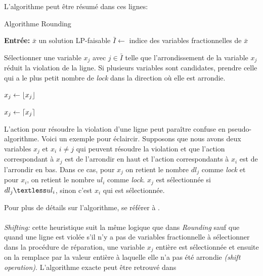 \documentclass[12pt,a4paper,oneside]{book}
\theoremstyle{definition}
\DeclarePairedDelimiter\ceil{\lceil}{\rceil}
\DeclarePairedDelimiter\floor{\lfloor}{\rfloor}
\begin{document}
	L'algorithme peut être résumé dans ces lignes:
		\begin{algorithm}
			\caption{Algorithme Rounding}
			\SetAlgoLined
			\DontPrintSemicolon
			\textbf{Entrée:} $\bar{x}$ un solution LP-faisable \;
			$\bar{I} \gets $ indice des variables fractionnelles de $\bar{x}$ \;
			{
				{
					Sélectionner une variable $x_j$ avec $ j \in \bar{I}$ telle que l'arrondissement de la variable $x_j$ réduit la violation de la ligne. Si plusieurs variables sont candidates, prendre celle qui a le plus petit nombre de \textit{lock} dans la direction où elle est arrondie. \;
				}
				{
					{
						$x_j \gets \floor{x_j} $ \;
					}
					{
						
						$x_j \gets \ceil{x_j} $ \;
					}
				}
			}
		
		\end{algorithm}

	L'action pour résoudre la violation d'une ligne peut paraître confuse en pseudo-algorithme. Voici un exemple pour éclaircir.
	Supposons que nous avons deux variables $x_j$ et $x_i$ $ i \neq j$ qui peuvent résoudre la violation et que l'action correspondant à $x_j$ est de l'arrondir en haut et l'action correspondants à $x_i$ est de l'arrondir en bas. Dans ce cas, pour $x_j$ on retient le nombre $dl_j$ comme \textit{lock} et pour $x_i$, on retient le nombre $ul_i$ comme \textit{lock}. $x_j$ est sélectionnée si $dl_j \textless ul_i$, sinon c'est $x_i$ qui est sélectionnée.  
	
	Pour plus de détails sur l'algorithme, se référer à \cite{berthold2006}.
	
	\paragraph{}
	\textit{Shifting:} cette heuristique suit la même logique que dans \textit{Rounding} sauf que quand une ligne est violée s'il n'y a pas de variables fractionnelle à sélectionner dans la procédure de réparation, une variable $x_j$ entière est sélectionnée et ensuite on la remplace par la valeur entière à laquelle elle n'a pas été arrondie \textit{(shift operation)}. L'algorithme exacte peut être retrouvé dans \cite{berthold2006}
	
	
\end{document}

